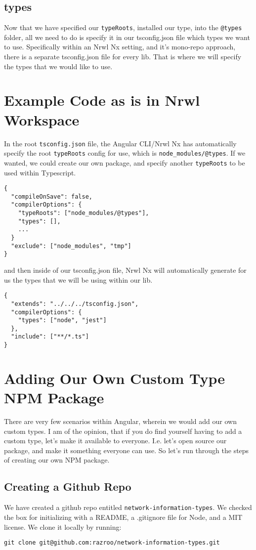 \subsection{types}
Now that we have specified our \lstinline{typeRoots}, installed our type, into 
the \lstinline{@types} folder, all we need to do is specify it in our 
tsconfig.json file which types we want to use. Specifically within an Nrwl Nx 
setting, and it's mono-repo approach, there is a separate tsconfig.json file 
for every lib. That is where we will specify the types that we would like to 
use. 

\section{Example Code as is in Nrwl Workspace}
In the root \lstinline{tsconfig.json} file, the Angular CLI/Nrwl Nx has automatically
specify the root \lstinline{typeRoots} config for use, which is \lstinline{node_modules/@types}.
If we wanted, we could create our own package, and specify another 
\lstinline{typeRoots} to be used within Typescript. 
\begin{lstlisting}[caption=tsconfig.json]
{
  "compileOnSave": false,
  "compilerOptions": {
    "typeRoots": ["node_modules/@types"],
    "types": [],
    ...
  }
  "exclude": ["node_modules", "tmp"]
}
\end{lstlisting}

and then inside of our tsconfig.json file, Nrwl Nx will automatically generate
for us the types that we will be using within our lib. 
\begin{lstlisting}[caption=libs/common/services/tsconfig.json]
{
  "extends": "../../../tsconfig.json",
  "compilerOptions": {
    "types": ["node", "jest"]
  },
  "include": ["**/*.ts"]
} 
\end{lstlisting}

\section{Adding Our Own Custom Type NPM Package}
There are very few scenarios within Angular, wherein we would add our own 
custom types. I am of the opinion, that if you do find yourself having to 
add a custom type, let's make it available to everyone. I.e. let's open source 
our package, and make it something everyone can use. So let's run through the 
steps of creating our own NPM package. 

\subsection{Creating a Github Repo}
We have created a github repo entitled \lstinline{network-information-types}. 
We checked the box for initializing with a README, a .gitignore file for Node,
and a MIT license. We clone it locally by running: 
\begin{verbatim}
git clone git@github.com:razroo/network-information-types.git
\end{verbatim}

